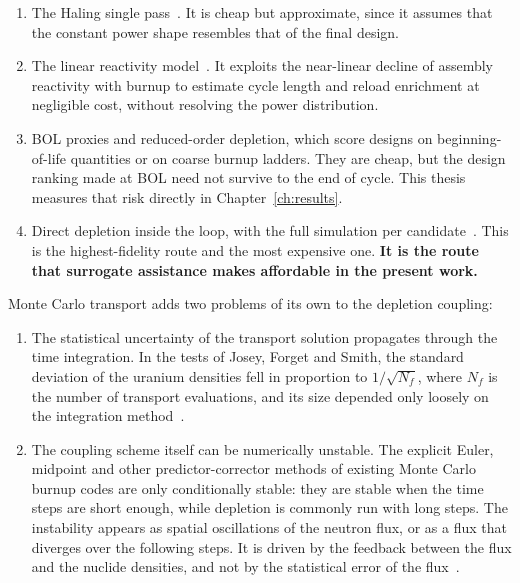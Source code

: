 \begin{enumerate}
  \item The Haling single pass~\cite{downar_1988}. It is cheap but
        approximate, since it assumes that the constant power shape
        resembles that of the final design.

  \item The linear reactivity model~\cite{lee_2020}. It exploits the
        near-linear decline of assembly reactivity with burnup to
        estimate cycle length and reload enrichment at negligible cost,
        without resolving the power distribution.

  \item BOL proxies and reduced-order depletion, which score designs on
        beginning-of-life quantities or on coarse burnup ladders. They
        are cheap, but the design ranking made at BOL need not survive to
        the end of cycle. This thesis measures that risk directly in
        Chapter~\ref{ch:results}.

  \item Direct depletion inside the loop, with the full simulation per
        candidate~\cite{romano_2021_depletion}. This is the
        highest-fidelity route and the most expensive one. \textbf{It is
        the route that surrogate assistance makes affordable in the
        present work.}
\end{enumerate}

Monte Carlo transport adds two problems of its own to the depletion
coupling:

\begin{enumerate}
  \item The statistical uncertainty of the transport solution propagates
        through the time integration. In the tests of Josey, Forget and
        Smith, the standard deviation of the uranium densities fell in
        proportion to $1/\sqrt{N_f}$, where $N_f$ is the number of
        transport evaluations, and its size depended only loosely on the
        integration method~\cite{josey_2017}.

  \item The coupling scheme itself can be numerically unstable. The
        explicit Euler, midpoint and other predictor-corrector methods of
        existing Monte Carlo burnup codes are only conditionally stable:
        they are stable when the time steps are short enough, while
        depletion is commonly run with long steps. The instability
        appears as spatial oscillations of the neutron flux, or as a flux
        that diverges over the following steps. It is driven by the
        feedback between the flux and the nuclide densities, and not by
        the statistical error of the flux~\cite{dufek_2013_sie}.
\end{enumerate}

